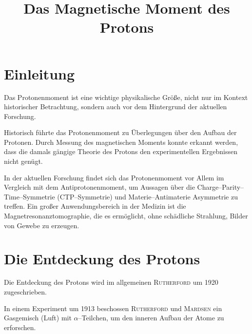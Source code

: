 \documentclass[sn-mathphys-num,iicol]{sn-jnl}
\theoremstyle{thmstyleone}
\theoremstyle{thmstyletwo}
\theoremstyle{thmstylethree}
\begin{document}
        
\title[Title]{Das Magnetische Moment des Protons}
\author*[1]{ }


\maketitle

\section{Einleitung}
Das Protonenmoment ist eine wichtige physikalische Größe, nicht nur im Kontext historischer Betrachtung, sondern auch vor dem Hintergrund der aktuellen Forschung.

Historisch führte das Protonenmoment zu Überlegungen über den Aufbau der Protonen.
Durch Messung des magnetischen Moments konnte erkannt werden, dass die damals gängige Theorie des Protons den experimentellen Ergebnissen nicht genügt.

In der aktuellen Forschung findet sich das Protonenmoment vor Allem im Vergleich mit dem Antiprotonenmoment, um Aussagen über die Charge--Parity--Time--Symmetrie (CTP--Symmetrie) und Materie--Antimaterie Asymmetrie zu treffen.
Ein großer Anwendungsbereich in der Medizin ist die Magnetresonanztomographie, die es ermöglicht, ohne schädliche Strahlung, Bilder von Gewebe zu erzeugen.

\section{Die Entdeckung des Protons}
Die Entdeckung des Protons wird im allgemeinen \textsc{Rutherford} um 1920 zugeschrieben.

In einem Experiment um 1913 beschossen \textsc{Rutherford} und \textsc{Mardsen} ein Gasgemisch (Luft) mit $\alpha $--Teilchen, um den inneren Aufbau der Atome zu erforschen.
\end{document}
